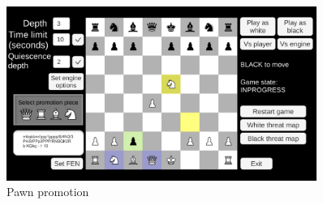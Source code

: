 \begin{figure}[h]
    \centering
    \includegraphics[width=0.9\textwidth]{figures/chess-game-promotion.png}
    \caption{Pawn promotion}
    \label{fig:promotion}
\end{figure}